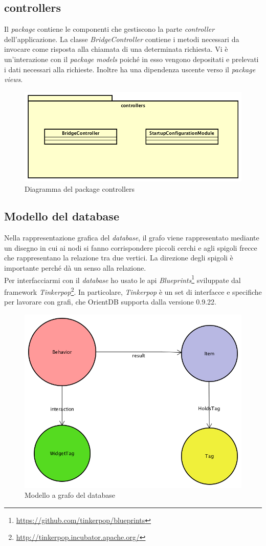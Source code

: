 \newpage
\subsection*{controllers}
Il \textit{package} contiene le componenti che gestiscono la parte \textit{controller} dell'applicazione. La classe \textit{BridgeController} contiene i metodi necessari da invocare come risposta alla chiamata di una determinata richiesta. Vi è un'interazione con il \textit{package models} poiché in esso vengono depositati e prelevati i dati necessari alla richieste. Inoltre ha una dipendenza uscente verso il \textit{package views}.
\begin{figure}[h]
\centering
\includegraphics[width=0.7\linewidth]{immagini/tres-controller}
\caption[Diagramma del package controllers]{Diagramma del package controllers}
\label{fig:tres-controller}
\end{figure}

\subsection{Modello del database}
Nella rappresentazione grafica del \textit{database}, il grafo viene rappresentato mediante
un disegno in cui ai nodi si fanno corrispondere piccoli cerchi e agli spigoli frecce che rappresentano la relazione tra due vertici. La direzione degli spigoli è importante perché dà un senso alla relazione.\\
Per interfacciarmi con il \textit{database} ho usato le \gls{api} \textit{Blueprints}\footnote{\url{https://github.com/tinkerpop/blueprints}} sviluppate dal \gls{framework} \textit{Tinkerpop}\footnote{\url{http://tinkerpop.incubator.apache.org/}}. In particolare, \textit{Tinkerpop} è un set di interfacce e specifiche per lavorare con grafi, che OrientDB supporta dalla versione 0.9.22.
\begin{figure}[h]
\centering
\includegraphics[width=0.6\linewidth]{immagini/db-a-graffo}
\caption[Modello a grafo del database]{Modello a grafo del database}
\label{fig:db-a-graffo}
\end{figure}


